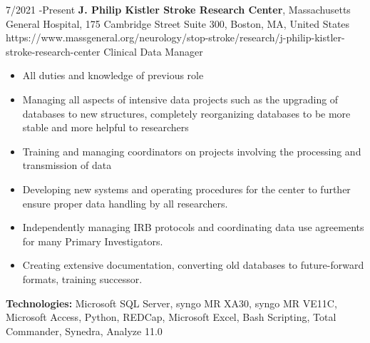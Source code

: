 \documentclass[10pt]{article} %
\begin{document}
\job
{7/2021 -}{Present}
{\textbf{J. Philip Kistler Stroke Research Center}, Massachusetts General Hospital, 175 Cambridge Street Suite 300, Boston, MA, United States}
{https://www.massgeneral.org/neurology/stop-stroke/research/j-philip-kistler-stroke-research-center}
{Clinical Data Manager}
{
\begin{itemize}
\item All duties and knowledge of previous role
\item Managing all aspects of intensive data projects such as the upgrading of databases to new structures, completely reorganizing databases to be more stable and more helpful to researchers
\item Training and managing coordinators on projects involving the processing and transmission of data
\item Developing new systems and operating procedures for the center to further ensure proper data handling by all researchers.
\item Independently managing IRB protocols and coordinating data use agreements for many Primary Investigators.
\item Creating extensive documentation, converting old databases to future-forward formats, training successor.
\end{itemize}
\rule{0mm}{5mm}\textbf{Technologies:} Microsoft SQL Server, syngo MR XA30, syngo MR VE11C, Microsoft Access, Python, REDCap, Microsoft Excel, Bash Scripting, Total Commander, Synedra, Analyze 11.0}

\end{document}
